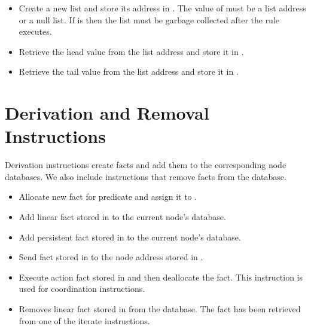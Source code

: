 \begin{itemize}
   \item {}

      Create a new list and store its address in . The value of
       must be a list address or a null list. If  is
       then the list must be garbage collected after the rule
      executes.

   \item {}

   Retrieve the head value from the list address  and store it in
   .

   \item {}

   Retrieve the tail value from the list address  and store it in
   .

\end{itemize}

\section{Derivation and Removal Instructions}

Derivation instructions create facts and add them to the corresponding node
databases. We also include instructions that remove facts from the database.

\begin{itemize}
   \item {}

      Allocate new fact for predicate  and assign it to .

   \item {}

      Add linear fact stored in  to the current node's database.

   \item {}

      Add persistent fact stored in  to the current node's database.

   \item {}

      Send fact stored in  to the node address stored in .

   \item {}

   Execute action fact stored in  and then deallocate the fact. This
   instruction is used for coordination instructions.

   \item {}

      Removes linear fact stored in  from the database. The fact has
      been retrieved from one of the iterate instructions.
\end{itemize}
